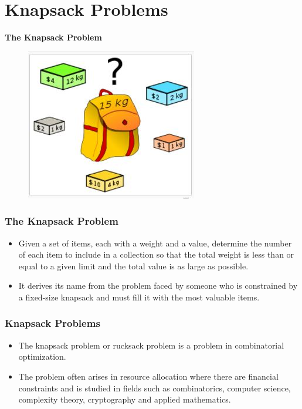 \documentclass{beamer}
\begin{document}
\section{Knapsack Problems}

\begin{frame}
\textbf{The Knapsack Problem}
\begin{figure}
\centering
\includegraphics[width=0.7\linewidth]{knapsack}

\end{figure}
\end{frame}
\begin{frame}
	\frametitle{The Knapsack Problem}
\Large
\begin{itemize}

\item Given a set of items, each with a weight and a value, determine the number of each item to include in a collection so that the total weight is less than or equal to a given limit and the total value is as large as possible.
\item It derives its name from the problem faced by someone who is constrained by a fixed-size knapsack and must fill it with the most valuable items.
\end{itemize}
	
\end{frame}
\begin{frame}
	\frametitle{Knapsack Problems}
	\Large
	\begin{itemize}
\item The knapsack problem or rucksack problem is a problem in combinatorial optimization.
\item The problem often arises in resource allocation where there are financial constraints and is studied in fields such as combinatorics, computer science, complexity theory, cryptography and applied mathematics.
\end{itemize}

\end{frame}
\end{document}

